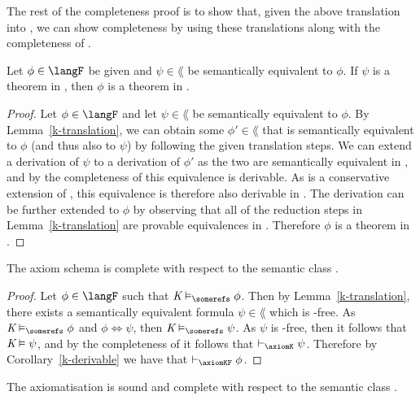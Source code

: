 The rest of the completeness proof is to show that, given the above translation
into \lang{}, we can show completeness by using these translations along with
the completeness of \logicK{}.

\begin{corollary}\label{k-derivable}
Let $\phi \in \langF$ be given and $\psi \in \lang$ be semantically
equivalent to $\phi$.  If $\psi$ is a theorem in \logicK{}, then $\phi$ is a
theorem in \axiomKF{}.
\end{corollary}

\begin{proof} %
Let $\phi \in \langF$ and let $\psi \in \lang$ be semantically equivalent to
$\phi$. By Lemma~\ref{k-translation}, we can obtain some $\phi' \in \lang$
that is semantically equivalent to $\phi$ (and thus also to $\psi$) by following
the given translation steps. We can extend a derivation of $\psi$ to a
derivation of $\phi'$ as the two are semantically equivalent in \logicK{}, and by
the completeness of \logicK{} this equivalence is derivable. As \axiomKF{} is a
conservative extension of \logicK{}, this equivalence is therefore also derivable
in \axiomKF{}. The derivation can be further extended to $\phi$ by observing that all
of the reduction steps in Lemma~\ref{k-translation} are provable equivalences
in \axiomKF{}. Therefore $\phi$ is a theorem in \axiomKF{}.
\end{proof}

\begin{lemma}\label{k-complete}
The axiom schema \axiomKF{} is complete with respect to the semantic class \classK{}.
\end{lemma}

\begin{proof}
Let $\phi \in \langF$ such that $\classK \entails_\somerefs \phi$. Then by
Lemma~\ref{k-translation}, there exists a semantically equivalent formula
$\psi \in \lang$ which is \somerefs-free. As $\classK \entails_\somerefs \phi$ and
$\phi \iff \psi$, then $\classK \entails_\somerefs \psi$. As $\psi$ is
\somerefs-free, then it follows that $\textit{K} \vDash \psi$, and by the
completeness of \axiomKF{} it follows that $\proves_{\axiomK} \psi$.
Therefore by Corollary~\ref{k-derivable} we have that $\proves_{\axiomKF}
\phi$.
\end{proof}

\begin{theorem}
The axiomatisation \axiomKF{} is sound and complete with respect to the semantic
class \classK{}.
\end{theorem}

